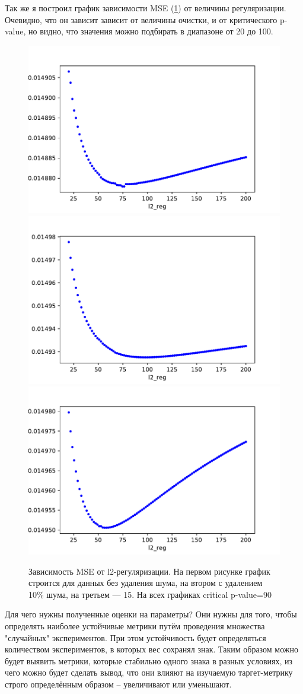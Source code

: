 \documentclass{article}
\begin{document}
	Так же я построил график зависимости MSE (\ref{fig:mse_l2}) от величины регуляризации. Очевидно, что он зависит зависит от величины очистки, и от критического p-value, но видно, что значения можно подбирать в диапазоне от 20 до 100. 	
	
	\begin{figure}[htp]
		
		\centering
		\includegraphics[width=.6\textwidth]{MSE_l2_dependency_0_filtering.pdf}\hfill
		\includegraphics[width=.6\textwidth]{MSE_l2_dependency_10_filtering.pdf}\hfill
		\includegraphics[width=.6\textwidth]{MSE_l2_dependency_15_filtering.pdf}
		
		\caption{Зависимость MSE от l2-регуляризации. На первом рисунке график строится для данных без удаления шума, на втором с удалением 10\% шума, на третьем --- 15. На всех графиках critical p-value=90}
		\label{fig:mse_l2}
	\end{figure}
	
	Для чего нужны полученные оценки на параметры? Они нужны для того, чтобы определять наиболее устойчивые метрики путём проведения множества "случайных" экспериментов. При этом устойчивость будет определяться количеством экспериментов, в которых вес сохранял знак. Таким образом можно будет выявить метрики, которые стабильно одного знака в разных условиях, из чего можно будет сделать вывод, что они влияют на изучаемую таргет-метрику строго определённым образом -- увеличивают или уменьшают. \\
	
\end{document}
